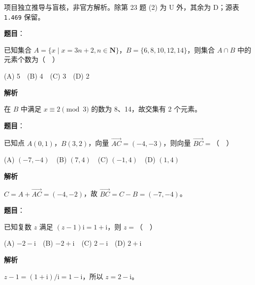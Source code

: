 

\begin{gktip}
项目独立推导与盲核，非官方解析。除第 23 题 (2) 为 U 外，其余为 D；源表 \texttt{1.469} 保留。
\end{gktip}

\begin{answer}

\textbf{题目}：

已知集合 $A=\{x\mid x=3n+2,n\in\mathbf N\}$，$B=\{6,8,10,12,14\}$，则集合 $A\cap B$ 中的元素个数为（　）

(A) 5　(B) 4　(C) 3　(D) 2

\textbf{解析}

在 $B$ 中满足 $x\equiv2\pmod3$ 的数为 8、14，故交集有 2 个元素。


\end{answer}
\begin{answer}

\textbf{题目}：

已知点 $A(0,1)$，$B(3,2)$，向量 $\overrightarrow{AC}=(-4,-3)$，则向量 $\overrightarrow{BC}=$（　）

(A) $(-7,-4)$　(B) $(7,4)$　(C) $(-1,4)$　(D) $(1,4)$

\textbf{解析}

$C=A+\overrightarrow{AC}=(-4,-2)$，故 $\overrightarrow{BC}=C-B=(-7,-4)$。


\end{answer}
\begin{answer}

\textbf{题目}：

已知复数 $z$ 满足 $(z-1)\mathrm i=1+\mathrm i$，则 $z=$（　）

(A) $-2-\mathrm i$　(B) $-2+\mathrm i$　(C) $2-\mathrm i$　(D) $2+\mathrm i$

\textbf{解析}

$z-1=(1+\mathrm i)/\mathrm i=1-\mathrm i$，所以 $z=2-\mathrm i$。


\end{answer}
